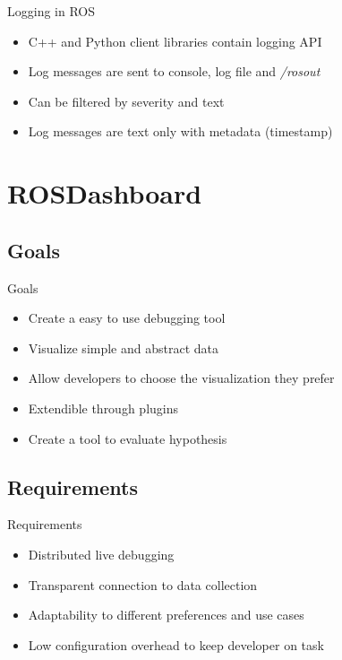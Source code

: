 \documentclass[compress]{beamer}
\begin{document}
\begin{frame}{Logging in ROS}
\begin{itemize}
\item C++ and Python client libraries contain logging API
\item Log messages are sent to console, log file and \emph{/rosout}
\item Can be filtered by severity and text
\item Log messages are text only with metadata (timestamp)
\end{itemize}
\end{frame}

\section{ROSDashboard}
\subsection{Goals}

\begin{frame}{Goals}
\begin{itemize}
\item Create a easy to use debugging tool
\item Visualize simple and abstract data
\item Allow developers to choose the visualization they prefer
\item Extendible through plugins
\item Create a tool to evaluate hypothesis
\end{itemize}
\end{frame}

\subsection{Requirements}
\begin{frame}{Requirements}
\begin{itemize}
\item Distributed live debugging
\item Transparent connection to data collection
\item Adaptability to different preferences and use cases
\item Low configuration overhead to keep developer on task
\end{itemize}
\end{frame}
\end{document}
